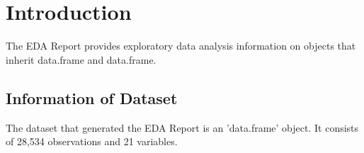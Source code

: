 \documentclass{book}\usepackage[]{graphicx}\usepackage[]{color}
\begin{document}
\newpage
\renewcommand{\cftchapdotsep}{\cftdotsep}
\tableofcontents







\chapter{Introduction}
The EDA Report provides exploratory data analysis information on objects that inherit data.frame and data.frame.

\section{Information of Dataset}
The dataset that generated the EDA Report is an 'data.frame' object. It consists of 28,534 observations and 21 variables.
\end{document}

